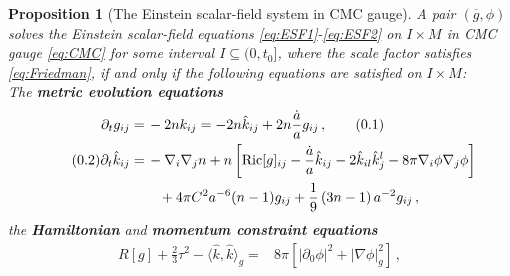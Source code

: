 \documentclass[11pt,leqno,textwidth=10cm]{amsart}
\numberwithin{equation}{section}
\theoremstyle{definition}
\theoremstyle{plain}
\newtheorem{prop}[definition]{Proposition}
\newcommand{\1}{\mathbbm{1}}
\newcommand{\g}{\overline{g}}
\newcommand{\I}{\mathbb{I}}
\newcommand{\Ric}{\text{\normalfont{Ric}}}
\newcommand{\del}{\partial}
\newcommand{\numberthis}{\addtocounter{equation}{1}\tag{\theequation}}
\renewcommand{\theequation}{\arabic{section}.\arabic{equation}}
\begin{document}
\begin{prop}[The Einstein scalar-field system in CMC gauge]\label{prop:eq}
A pair $(\g,\phi)$ solves the Einstein scalar-field equations \eqref{eq:ESF1}-\eqref{eq:ESF2} on $I\times M$ in CMC gauge \eqref{eq:CMC} for some interval $I\subseteq (0,t_0]$, where the scale factor satisfies \eqref{eq:Friedman}, if and only if the following equations are satisfied on $I\times M$:\\
The \textbf{metric evolution equations}
\begin{subequations}
\begin{align*}
\del_t g_{ij}=&\,-2nk_{ij}=-2n\hat{k}_{ij}+2n\frac{\dot{a}}ag_{ij}\,, \numberthis\label{eq:EEqg}\\
\numberthis\label{eq:EEqk}\del_t \hat{k}_{ij}%
=&\,-\nabla_i\nabla_jn+n\left[\Ric[g]_{ij}-\frac{\dot{a}}a\hat{k}_{ij}-2\hat{k}_{il}\hat{k}^l_j-8\pi\nabla_i\phi\nabla_j\phi\right]\\
&\quad+4\pi C^2a^{-6}(n-1)g_{ij}+\frac19\left(3n-1\right)a^{-2}g_{ij}\,,%
\end{align*}
\end{subequations}
the \textbf{Hamiltonian} and \textbf{momentum constraint equations}
\begin{subequations}
\begin{align}
R[g]+\frac23\tau^2-\langle\hat{k},\hat{k}\rangle_g=&8\pi\left[\lvert \del_0\phi\rvert^2+\lvert\nabla\phi\rvert_g^2\right] \label{eq:Hamilton}\,,\\

\end{align}
\end{subequations}
\end{prop}
\end{document}
